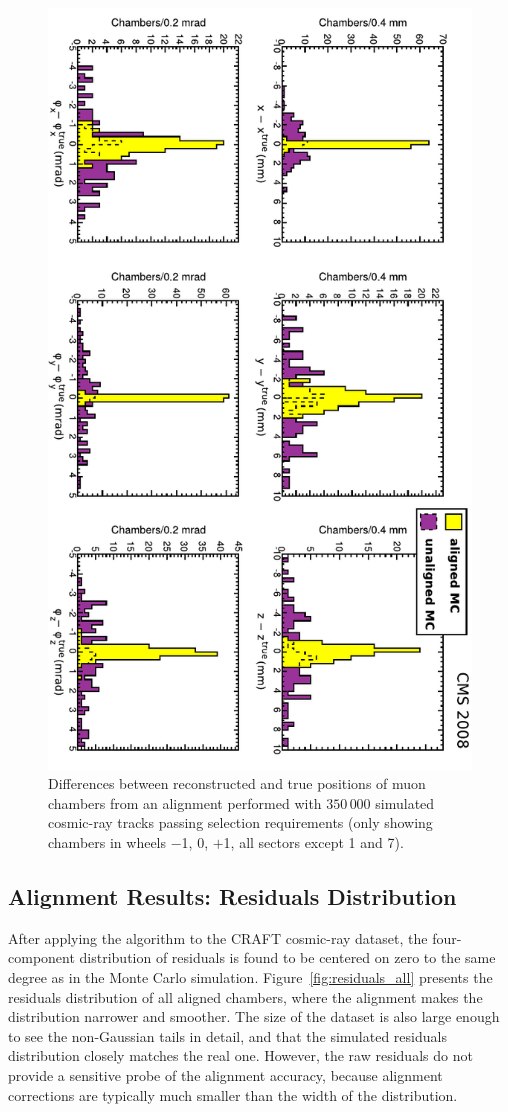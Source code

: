 \begin{figure}[p]
\includegraphics[height=\linewidth, angle=90]{plots/mc_and_syst_studies/hip_MC.pdf}

\caption{Differences between reconstructed and true positions of muon
chambers from an alignment performed with $350\,000$ simulated cosmic-ray tracks passing selection requirements
(only showing chambers in wheels $-$1, 0, $+$1, all sectors except 1 and 7). \label{fig:hip_MC}}
\end{figure}

\subsection{Alignment Results: Residuals Distribution}
\label{sec:gmaresults2}

After applying the algorithm to the CRAFT cosmic-ray dataset,
the four-component distribution of residuals is found to be centered on zero
to the same degree as in the Monte Carlo simulation.
Figure~\ref{fig:residuals_all} presents the residuals distribution of
all aligned chambers, where the alignment makes the
distribution narrower and smoother.  The size of the dataset is also
large enough to see the non-Gaussian tails in detail, and that the
simulated residuals distribution closely matches the real one.
However, the raw residuals do not provide a sensitive probe of the
alignment accuracy, because alignment corrections are typically much
smaller than the width of the distribution.

